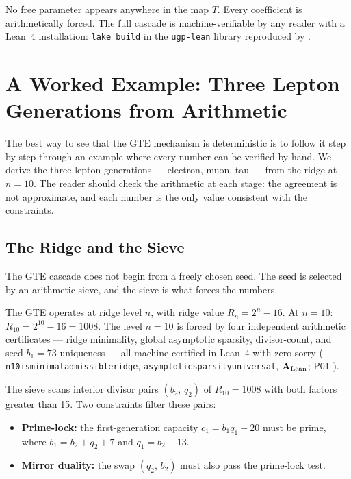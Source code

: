 \documentclass[11pt,openany]{book}
\theoremstyle{remark}
\newcommand{\lean}[1]{%
  \penalty-100
  \begingroup\def\_{\textunderscore\allowbreak}\texttt{#1}\endgroup}
\newcommand{\CatAL}{\ensuremath{\textbf{A}_{\rm Lean}}}
\begin{document}
No free parameter appears anywhere in the map $T$.
Every coefficient is arithmetically forced.
The full cascade is machine-verifiable by any reader with a Lean~4 installation:
\texttt{lake build} in the \texttt{ugp-lean} library reproduced by \cite{SpivackUGPPhysicsLean}.

\section{A Worked Example: Three Lepton Generations from Arithmetic}
\label{sec:gte_cascade}

The best way to see that the GTE mechanism is deterministic is to follow it
step by step through an example where every number can be verified by hand.
We derive the three lepton generations --- electron, muon, tau --- from the ridge at
$n = 10$.
The reader should check the arithmetic at each stage: the agreement is not approximate,
and each number is the only value consistent with the constraints.

\subsection{The Ridge and the Sieve}
\label{sec:gte_cascade_sieve}

The GTE cascade does not begin from a freely chosen seed.
The seed is selected by an arithmetic sieve, and the sieve is what forces the numbers.

The GTE operates at ridge level $n$, with ridge value $R_n = 2^n - 16$.
At $n = 10$: $R_{10} = 2^{10} - 16 = 1008$.
The level $n = 10$ is forced by four independent arithmetic certificates --- ridge
minimality, global asymptotic sparsity, divisor-count, and seed-$b_1 = 73$
uniqueness --- all machine-certified in Lean~4 with zero sorry
(\lean{n10\_is\_minimal\_admissible\_ridge}, \lean{asymptotic\_sparsity\_universal},
\CatAL; P01 \cite{SpivackSM}).

The sieve scans interior divisor pairs $(b_2,\,q_2)$ of $R_{10} = 1008$ with both
factors greater than 15.
Two constraints filter these pairs:
\begin{itemize}[itemsep=2pt,topsep=4pt]
\item \textbf{Prime-lock:} the first-generation capacity
  $c_1 = b_1 q_1 + 20$ must be prime, where $b_1 = b_2 + q_2 + 7$ and $q_1 = b_2 - 13$.
\item \textbf{Mirror duality:} the swap $(q_2,\,b_2)$ must also pass the prime-lock test.
\end{itemize}
\end{document}
